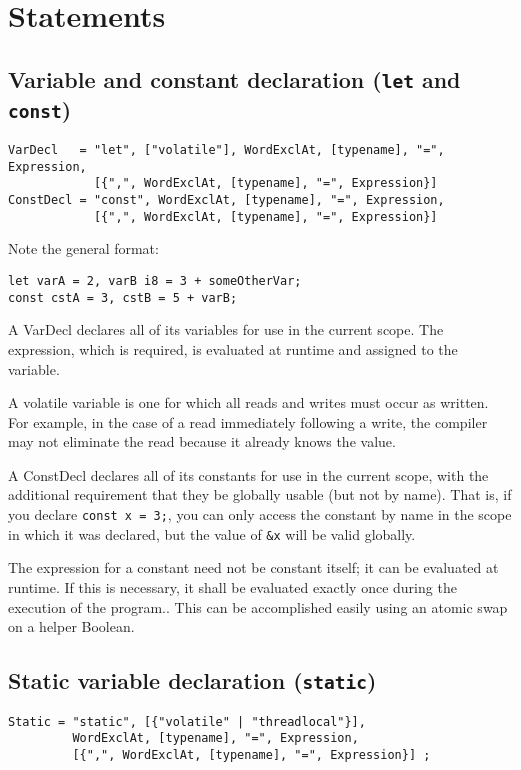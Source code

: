 \documentclass{article}
\begin{document}
\section{Statements}
\label{sec:statements}

\subsection{Variable and constant declaration (\texttt{let} and \texttt{const})}
\label{sub:statements:vardecl}
\begin{verbatim}
VarDecl   = "let", ["volatile"], WordExclAt, [typename], "=", Expression,
            [{",", WordExclAt, [typename], "=", Expression}]
ConstDecl = "const", WordExclAt, [typename], "=", Expression,
            [{",", WordExclAt, [typename], "=", Expression}]
\end{verbatim}
Note the general format:
\begin{verbatim}
let varA = 2, varB i8 = 3 + someOtherVar;
const cstA = 3, cstB = 5 + varB;
\end{verbatim}
A VarDecl declares all of its variables for use in the current scope. The
expression, which is required, is evaluated at runtime and assigned to the
variable.

A volatile variable is one for which all reads and writes must occur as written.
For example, in the case of a read immediately following a write, the compiler
may not eliminate the read because it already knows the value.

A ConstDecl declares all of its constants for use in the current scope, with the
additional requirement that they be globally usable (but not by name). That is,
if you declare \texttt{const~x~=~3;}, you can only access the constant by name in
the scope in which it was declared, but the value of \texttt{\&x} will be valid
globally.

The expression for a constant need not be constant itself; it can be evaluated
at runtime. If this is necessary, it shall be evaluated exactly once during the
execution of the program..
This can be accomplished easily using an atomic swap on a helper
Boolean.

\subsection{Static variable declaration (\texttt{static})}
\label{sub:statements:static}
\begin{verbatim}
Static = "static", [{"volatile" | "threadlocal"}],
         WordExclAt, [typename], "=", Expression,
         [{",", WordExclAt, [typename], "=", Expression}] ;
\end{verbatim}
\end{document}
